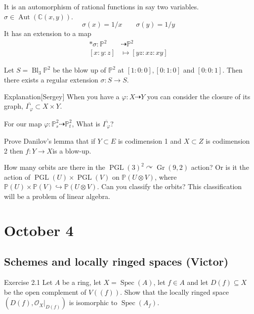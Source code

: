 It is an automorphism of rational functions in say two variables. $\sigma\in\operatorname{Aut}(\mathbb{C}(x,y))$.
\[\sigma(x)=1/x\qquad \sigma(y)=1/y\]
It has an extension to a map
\begin{align*}*\sigma:\mathbb{P}^2 &\dashrightarrow \mathbb{P}^2\\
	[x:y:z]&\longmapsto [yz:xz:xy]
\end{align*}

\begin{claim}\leavevmode
	Let $S=\operatorname{Bl}_3\mathbb{P}^2$ be the blow up of $\mathbb{P}^{2}$ at $[1:0:0],[0:1:0]$ and  $[0:0:1]$. Then there exists a regular extension $\sigma:S \longrightarrow S$.
\end{claim}

\begin{thing4}{Explanation}[Sergey]\leavevmode
	When you have a $\varphi:X\dashrightarrow Y$ you can consider the closure of its graph, $\overline{\Gamma_\varphi}\subset X\times Y$.

	For our map $\varphi:\mathbb{P}^{2}_s\dashrightarrow \mathbb{P}^2_t$, {\color{6}What is $\overline{\Gamma_\varphi}$?}
\end{thing4}

\begin{exercise}\leavevmode
	Prove Danilov's lemma that if $Y\subset E$ is codimension 1 and $X\subset Z$ is codimension 2 then $f:Y\longrightarrow X$is a blow-up.
\end{exercise}

\begin{exercise}\leavevmode
	How many orbits are there in the $\operatorname{PGL}(3)^2\curvearrowright \operatorname{Gr}(9,2)$ action? Or is it the action of $\operatorname{PGL}(U)\times \operatorname{PGL}(V)$ on $\mathbb{P}(U\otimes V)$, where $\mathbb{P}(U)\times \mathbb{P}(V)\hookrightarrow \mathbb{P}(U\otimes V)$. Can you classify the orbits? This classification will be a problem of linear algebra.
\end{exercise}

\section{October 4}

\subsection{Schemes and locally ringed spaces (Victor)}

\begin{thing4}{Exercise 2.1}\leavevmode
	Let $A$ be a ring, let $X= \operatorname{Spec}(A)$, let $f\in A$ and let $D(f)\subseteq X$ be the open complement of $V((f))$. Show that the locally ringed space  $(D(f),\mathcal{O}_X|_{D(f)})$ is isomorphic to $\operatorname{Spec}(A_f)$.
\end{thing4}

